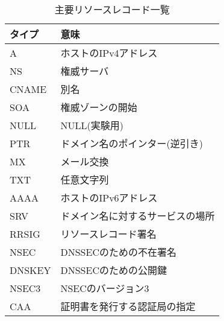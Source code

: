 \begin{table}[h]
 \caption{主要リソースレコード一覧}
 \centering
  \begin{tabular}{ll}
    \toprule
    \textbf{タイプ} & \textbf{意味} \\
    \midrule
    A &  ホストのIPv4アドレス \\
    NS & 権威サーバ \\
    CNAME & 別名 \\
    SOA & 権威ゾーンの開始 \\
    NULL & NULL(実験用) \\
    PTR & ドメイン名のポインター(逆引き) \\
    MX & メール交換 \\
    TXT & 任意文字列 \\
    AAAA & ホストのIPv6アドレス \\
		SRV & ドメイン名に対するサービスの場所\\
    RRSIG & リソースレコード署名\\
    NSEC & DNSSECのための不在署名\\
    DNSKEY & DNSSECのための公開鍵\\
    NSEC3 & NSECのバージョン3\\
    CAA & 証明書を発行する認証局の指定\\
    \bottomrule
  \end{tabular}
 \label{tab:resource-record}
\end{table}
